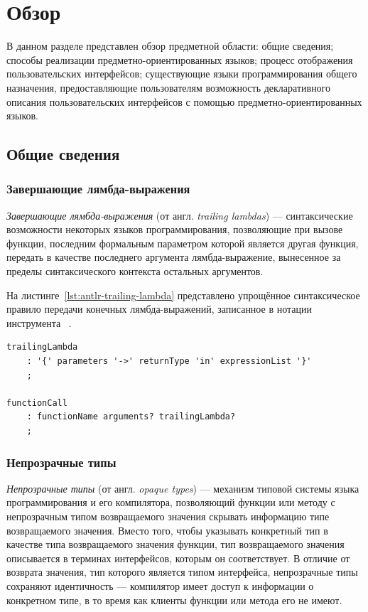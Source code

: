 \section{Обзор}
В данном разделе представлен обзор предметной области:
общие сведения; способы реализации предметно-ориентированных
языков; процесс отображения пользовательских интерфейсов; существующие языки
программирования общего назначения, предоставляющие пользователям возможность декларативного описания пользовательских
интерфейсов с помощью предметно-ориентированных языков.

\subsection{Общие сведения}
\subsubsection{Завершающие лямбда-выражения}
\label{section:trailing-lambdas}
\textit{Завершающие лямбда-выражения} (от англ. \textit{trailing lambdas})
--- синтаксические возможности некоторых языков программирования,
позволяющие при вызове функции, последним формальным параметром которой
является другая функция, передать в качестве последнего
аргумента лямбда-выражение, вынесенное за пределы синтаксического контекста
остальных аргументов.

На листинге~\ref{lst:antlr-trailing-lambda} представлено упрощённое
синтаксическое правило передачи конечных лямбда-выражений, записанное
в нотации инструмента ~\cite{antlr-homepage}.
\begin{lstlisting}[style=Antlr, caption=Синтаксис завершающих
лямбда-выражений, label={lst:antlr-trailing-lambda}]
trailingLambda
	: '{' parameters '->' returnType 'in' expressionList '}'
	;

functionCall
	: functionName arguments? trailingLambda?
	;
\end{lstlisting}
\subsubsection{Непрозрачные типы}
\label{section:opaque-types}
\textit{Непрозрачные типы} (от англ. \textit{opaque types})
--- механизм типовой системы языка программирования и его компилятора,
позволяющий функции или методу с непрозрачным типом возвращаемого значения
скрывать информацию типе возвращаемого значения. Вместо того, чтобы
указывать конкретный тип в качестве типа возвращаемого значения функции,
тип возвращаемого значения описывается в терминах интерфейсов, которым
он соответствует. В отличие от возврата значения, тип которого является
типом интерфейса, непрозрачные типы сохраняют идентичность ---
компилятор имеет доступ к информации о конкретном типе, в то время как
клиенты функции или метода его не имеют.
